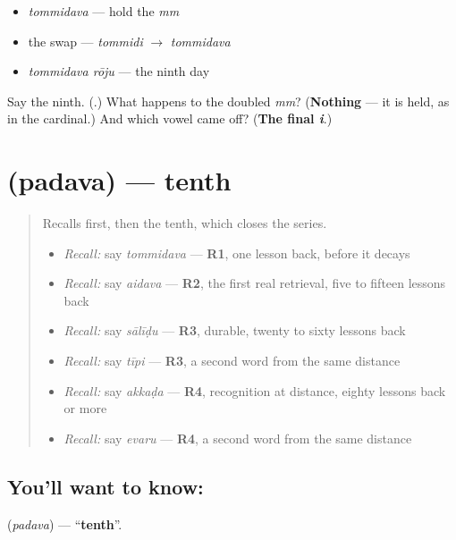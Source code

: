 \begin{itemize}
\raggedright
  \item \emph{tommidava} — hold the \emph{mm}
  \item the swap — \emph{tommidi} $\to$ \emph{tommidava}
  \item \emph{tommidava rōju} — the ninth day
\end{itemize}

\begin{tcolorbox}[breakable,colback=teal!4,colframe=teal!35!black,title={Before you move on}]
Say the ninth. (\textbf{}.) What happens to the doubled \emph{mm}? (\textbf{Nothing} — it is held, as in the cardinal.) And which vowel came off? (\textbf{The final \emph{i}}.)
\end{tcolorbox}
\section[\texorpdfstring{\te{పదవ} (padava)}{పదవ (padava)}]{ (padava) — tenth}

\label{lesson:TE-C82-tenth}



\begin{quote}
Recalls first, then the tenth, which closes the series.

\begin{itemize}
\raggedright
  \item \emph{Recall:} say \emph{tommidava} — \textbf{R1}, one lesson back, before it decays
  \item \emph{Recall:} say \emph{aidava} — \textbf{R2}, the first real retrieval, five to fifteen lessons back
  \item \emph{Recall:} say \emph{sālīḍu} — \textbf{R3}, durable, twenty to sixty lessons back
  \item \emph{Recall:} say \emph{tīpi} — \textbf{R3}, a second word from the same distance
  \item \emph{Recall:} say \emph{akkaḍa} — \textbf{R4}, recognition at distance, eighty lessons back or more
  \item \emph{Recall:} say \emph{evaru} — \textbf{R4}, a second word from the same distance
\end{itemize}
\end{quote}

\subsection*{You'll want to know: }
\textbf{} (\emph{padava}) — \textquotedblleft{}\textbf{tenth}\textquotedblright{}.

